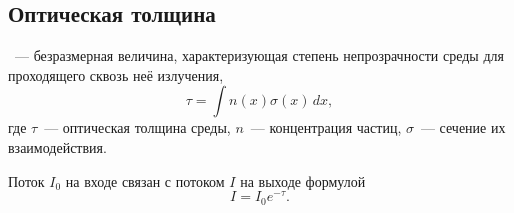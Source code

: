 \subsection{Оптическая толщина}
~--- безразмерная величина, характеризующая степень непрозрачности среды для проходящего сквозь неё излучения,
\begin{equation}
\tau = \int n(x) \sigma(x)\,dx,
\end{equation}
где $\tau$~--- оптическая толщина среды, $n$~--- концентрация частиц, $\sigma$~--- сечение их взаимодействия.

Поток $I_0$ на входе связан с потоком $I$ на выходе формулой
\begin{equation}
I = I_0 e^{-\tau}.
\end{equation}